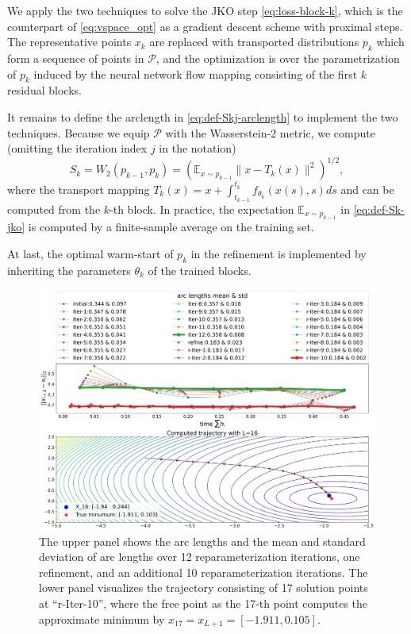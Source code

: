 \documentclass{article}
\theoremstyle{remark}
\theoremstyle{plain}
\newcommand{\E}{\mathbb{E}}
\newcommand{\calP}{\mathcal{P}}
\begin{document}
{We apply the two techniques to solve the JKO step \eqref{eq:loss-block-k},
which is the counterpart of \eqref{eq:vspace_opt}
as a gradient descent scheme with proximal steps.
The representative points $x_k$ are replaced with transported distributions $p_k$ which form a sequence of points in $\calP$,
and the optimization is over the parametrization of $p_k$ induced by the neural network flow mapping consisting of the first $k$ residual blocks. 

It remains to define the arclength in \eqref{eq:def-Skj-arclength} to implement the two techniques. 
Because we equip $\calP$ with the Wasserstein-2 metric, we compute (omitting the iteration index $j$ in the notation)
\begin{equation}\label{eq:def-Sk-jko}
    S_k 
= W_2(p_{k-1}, p_k)
= (\E_{x \sim p_{k-1}} \| x-T_k(x)\|^2 )^{1/2},
\end{equation}
where the transport mapping $T_k(x) =x+ \int_{t_{k-1}}^{t_k} f_{\theta_k}(x(s),s)ds$ and can be computed from the $k$-th block. In practice, the expectation $\E_{x \sim p_{k-1}}$ in \eqref{eq:def-Sk-jko} is computed by a finite-sample average on the training set. 

At last, the optimal warm-start of $p_k$ in the refinement is implemented by inheriting the parameters $\theta_k$ of the trained blocks.

\begin{figure}[!b]
    \centering
    \includegraphics[width=\textwidth]{vector_space_reparam_and_refine.png}
    \caption{The upper panel shows the arc lengths and the mean and standard deviation of arc lengths over 12 reparameterization iterations, one refinement, and an additional 10 reparameterization iterations. The lower panel visualizes the trajectory consisting of 17 solution points at ``r-Iter-10'', where the free point as the 17-th point computes the approximate minimum by $x_{17}=x_{L+1}=[-1.911, 0.105]$.}
    \label{fig_reparam_muller}
\end{figure}









}
\end{document}
